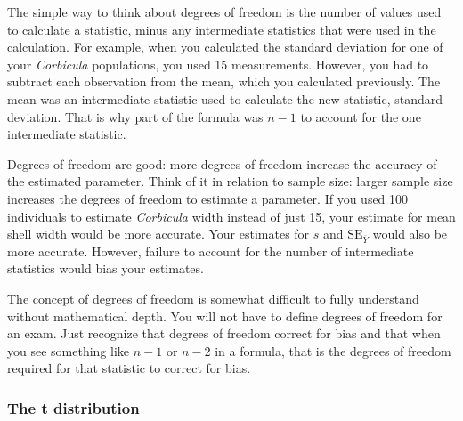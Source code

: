 \documentclass[12pt]{exam}
\newcommand*\meansubY{\overline{Y}}
\newcommand*\Corbicula{\textit{Corbicula}}
\begin{document}
The simple way to think about degrees of freedom is the number of values used to calculate a statistic, minus any intermediate statistics that were used in the calculation. For example, when you calculated the standard deviation for one of your \Corbicula{} populations, you used 15 measurements. However, you had to subtract each observation from the mean, which you calculated previously. The mean was an intermediate statistic used to calculate the new statistic, standard deviation. That is why part of the formula was $n-1$ to account for the one intermediate statistic. 

Degrees of freedom are good: more degrees of freedom increase the accuracy of the estimated parameter. Think of it in relation to sample size: larger sample size increases the degrees of freedom to estimate a parameter. If you used 100 individuals to estimate \Corbicula{} width instead of just 15, your estimate for mean shell width would be more accurate. Your estimates for $s$ and $\mathrm{SE}_{\meansubY}$ would also be more accurate. However, failure to account for the number of intermediate statistics would bias your estimates.

The concept of degrees of freedom is somewhat difficult to fully understand without mathematical depth. You will not have to define degrees of freedom for an exam. Just recognize that degrees of freedom correct for bias and that when you see something like $n-1$ or $n-2$ in a formula, that is the degrees of freedom required for that statistic to correct for bias.


\newpage

\subsubsection*{The t distribution}

\newsavebox\ltmcbox
\end{document}
